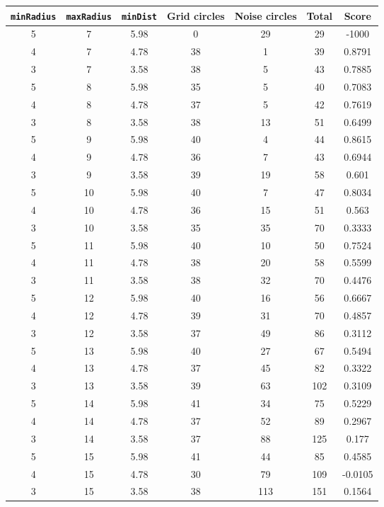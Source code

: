 \documentclass[letterpaper, 12pt]{article}
\begin{document}
\begin{longtable}{|c|c|c|c|c|c|c|}
\hline
\textbf{\texttt{minRadius}} & \textbf{\texttt{maxRadius}} & \textbf{\texttt{minDist}} & \textbf{Grid circles} & \textbf{Noise circles} & \textbf{Total} & \textbf{Score} \\
\hline
5 & 7 & 5.98 & 0 & 29 & 29 & -1000 \\
\hline
4 & 7 & 4.78 & 38 & 1 & 39 & 0.8791 \\
\hline
3 & 7 & 3.58 & 38 & 5 & 43 & 0.7885 \\
\hline
5 & 8 & 5.98 & 35 & 5 & 40 & 0.7083 \\
\hline
4 & 8 & 4.78 & 37 & 5 & 42 & 0.7619 \\
\hline
3 & 8 & 3.58 & 38 & 13 & 51 & 0.6499 \\
\hline
5 & 9 & 5.98 & 40 & 4 & 44 & 0.8615 \\
\hline
4 & 9 & 4.78 & 36 & 7 & 43 & 0.6944 \\
\hline
3 & 9 & 3.58 & 39 & 19 & 58 & 0.601 \\
\hline
5 & 10 & 5.98 & 40 & 7 & 47 & 0.8034 \\
\hline
4 & 10 & 4.78 & 36 & 15 & 51 & 0.563 \\
\hline
3 & 10 & 3.58 & 35 & 35 & 70 & 0.3333 \\
\hline
5 & 11 & 5.98 & 40 & 10 & 50 & 0.7524 \\
\hline
4 & 11 & 4.78 & 38 & 20 & 58 & 0.5599 \\
\hline
3 & 11 & 3.58 & 38 & 32 & 70 & 0.4476 \\
\hline
5 & 12 & 5.98 & 40 & 16 & 56 & 0.6667 \\
\hline
4 & 12 & 4.78 & 39 & 31 & 70 & 0.4857 \\
\hline
3 & 12 & 3.58 & 37 & 49 & 86 & 0.3112 \\
\hline
5 & 13 & 5.98 & 40 & 27 & 67 & 0.5494 \\
\hline
4 & 13 & 4.78 & 37 & 45 & 82 & 0.3322 \\
\hline
3 & 13 & 3.58 & 39 & 63 & 102 & 0.3109 \\
\hline
5 & 14 & 5.98 & 41 & 34 & 75 & 0.5229 \\
\hline
4 & 14 & 4.78 & 37 & 52 & 89 & 0.2967 \\
\hline
3 & 14 & 3.58 & 37 & 88 & 125 & 0.177 \\
\hline
5 & 15 & 5.98 & 41 & 44 & 85 & 0.4585 \\
\hline
4 & 15 & 4.78 & 30 & 79 & 109 & -0.0105 \\
\hline
3 & 15 & 3.58 & 38 & 113 & 151 & 0.1564 \\

\end{longtable}
\end{document}
